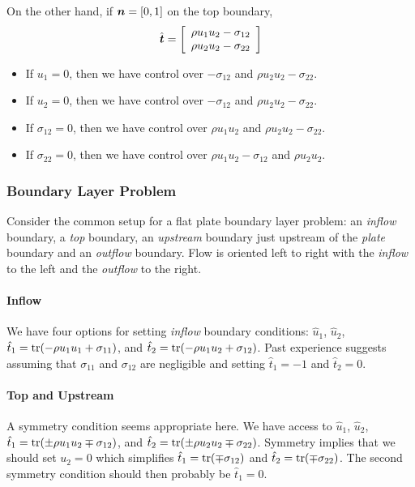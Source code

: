 \documentclass{article}
\begin{document}
On the other hand, if $\boldsymbol n=[0,1]$ on the top boundary,
\begin{equation*}
\hat{\boldsymbol t}=\left[ 
\begin{array}{c}
\rho u_1u_2-\sigma_{12} \\
\rho u_2u_2-\sigma_{22} \\
\end{array}
 \right]
\end{equation*}
\begin{itemize}
  \item If $u_1=0$, then we have control over $-\sigma_{12}$ and $\rho u_2u_2-\sigma_{22}$.
  \item If $u_2=0$, then we have control over $-\sigma_{12}$ and $\rho u_2u_2-\sigma_{22}$.
  \item If $\sigma_{12}=0$, then we have control over $\rho u_1u_2$ and $\rho u_2u_2-\sigma_{22}$.
  \item If $\sigma_{22}=0$, then we have control over $\rho u_1u_2-\sigma_{12}$ and $\rho u_2u_2$.
\end{itemize}

\subsubsection*{Boundary Layer Problem}
Consider the common setup for a flat plate boundary layer problem: an \emph{inflow} boundary, a \emph{top} boundary, an \emph{upstream} boundary just upstream of the \emph{plate} boundary and an \emph{outflow} boundary. Flow is oriented left to right with the \emph{inflow} to the left and the \emph{outflow} to the right.

\paragraph*{Inflow}
We have four options for setting \emph{inflow} boundary conditions: $\hat u_1$, $\hat u_2$,
$\hat t_1=\operatorname*{tr}(-\rho u_1u_1+\sigma_{11})$, and $\hat t_2=\operatorname*{tr}(-\rho u_1u_2+\sigma_{12})$.
Past experience suggests assuming that $\sigma_{11}$ and $\sigma_{12}$ are negligible and setting $\hat t_1=-1$ and $\hat t_2=0$.

\paragraph*{Top and Upstream}
A symmetry condition seems appropriate here. We have access to $\hat u_1$, $\hat u_2$,
$\hat t_1=\operatorname*{tr}(\pm\rho u_1u_2\mp\sigma_{12})$, and $\hat t_2=\operatorname*{tr}(\pm\rho u_2u_2\mp\sigma_{22})$.
Symmetry implies that we should set $u_2=0$ which simplifies $\hat t_1=\operatorname*{tr}(\mp\sigma_{12})$ and $\hat t_2=\operatorname*{tr}(\mp\sigma_{22})$.
The second symmetry condition should then probably be $\hat t_1=0$.
\end{document}
